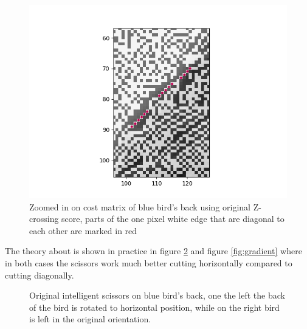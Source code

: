\documentclass[11pt]{article}
\begin{document}
\begin{figure}[H]
	\centering
	\includegraphics{cost_closeup_back_bird_marked.png}
	\caption{\label{fig:bird_cost_mod_marked}Zoomed in on cost matrix of blue bird's back using original Z-crossing score, parts of the one pixel white edge that are diagonal to each other are marked in red}
\end{figure}

The theory about is shown in practice in figure \ref{fig:bird_orient} and figure \ref{fig:gradient} where in both cases the scissors work much better cutting horizontally compared to cutting diagonally.

\begin{figure}[H]
%
\hfill
{}%
\caption{\label{fig:bird_orient} Original intelligent scissors on blue bird's back, one the left the back of the bird is rotated to horizontal position, while on the right bird is left in the original orientation.}
\end{figure}
\end{document}

